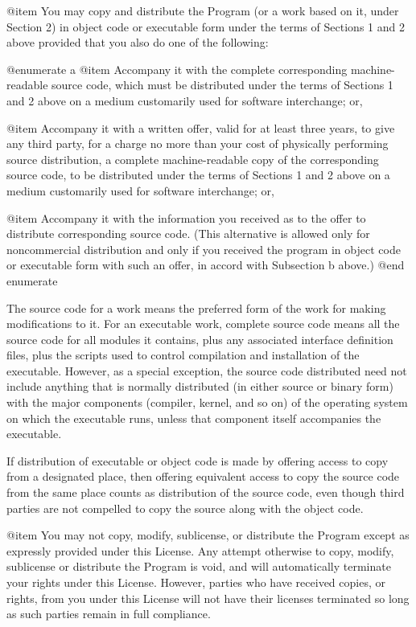 @item
You may copy and distribute the Program (or a work based on it,
under Section 2) in object code or executable form under the terms of
Sections 1 and 2 above provided that you also do one of the following:

@enumerate a
@item
Accompany it with the complete corresponding machine-readable
source code, which must be distributed under the terms of Sections
1 and 2 above on a medium customarily used for software interchange; or,

@item
Accompany it with a written offer, valid for at least three
years, to give any third party, for a charge no more than your
cost of physically performing source distribution, a complete
machine-readable copy of the corresponding source code, to be
distributed under the terms of Sections 1 and 2 above on a medium
customarily used for software interchange; or,

@item
Accompany it with the information you received as to the offer
to distribute corresponding source code.  (This alternative is
allowed only for noncommercial distribution and only if you
received the program in object code or executable form with such
an offer, in accord with Subsection b above.)
@end enumerate

The source code for a work means the preferred form of the work for
making modifications to it.  For an executable work, complete source
code means all the source code for all modules it contains, plus any
associated interface definition files, plus the scripts used to
control compilation and installation of the executable.  However, as a
special exception, the source code distributed need not include
anything that is normally distributed (in either source or binary
form) with the major components (compiler, kernel, and so on) of the
operating system on which the executable runs, unless that component
itself accompanies the executable.

If distribution of executable or object code is made by offering
access to copy from a designated place, then offering equivalent
access to copy the source code from the same place counts as
distribution of the source code, even though third parties are not
compelled to copy the source along with the object code.

@item
You may not copy, modify, sublicense, or distribute the Program
except as expressly provided under this License.  Any attempt
otherwise to copy, modify, sublicense or distribute the Program is
void, and will automatically terminate your rights under this License.
However, parties who have received copies, or rights, from you under
this License will not have their licenses terminated so long as such
parties remain in full compliance.

